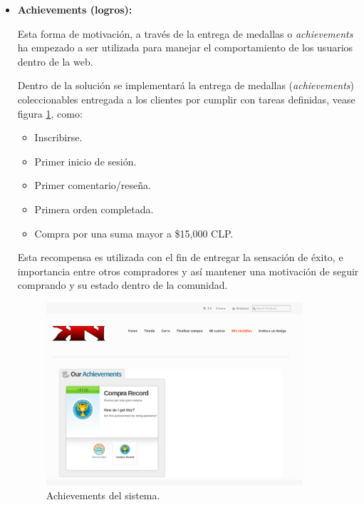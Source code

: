 \begin{itemize}
    \item {\bf Achievements (logros):}

	Esta forma de motivación, a través de la entrega de medallas o \emph{achievements}
	ha empezado a ser utilizada para manejar el comportamiento de los
	usuarios dentro de la web\cite{BehaviorBadges}.

        Dentro de la solución se implementará la entrega de medallas (\emph{achievements})
	coleccionables entregada a los clientes por cumplir con tareas definidas, vease
	figura \ref{fig:achievement}, como:

        \begin{itemize}
            \item Inscribirse.
            \item Primer inicio de sesión.
            \item Primer comentario/reseña.
            \item Primera orden completada.
            \item Compra por una suma mayor a \$15,000 CLP.
        \end{itemize}

        Esta recompensa es utilizada con el fin de entregar la sensación de éxito,
        e importancia entre otros compradores y así mantener una motivación
        de seguir comprando y su estado dentro de la comunidad.

\begin{figure}[!htb]
  \centering
  \includegraphics[width=0.9\textwidth]{images/Tienda/Tienda_achievement.png}
  \caption[Achievement]{Achievements del sistema.}
  \label{fig:achievement}
\end{figure}




\end{itemize}
